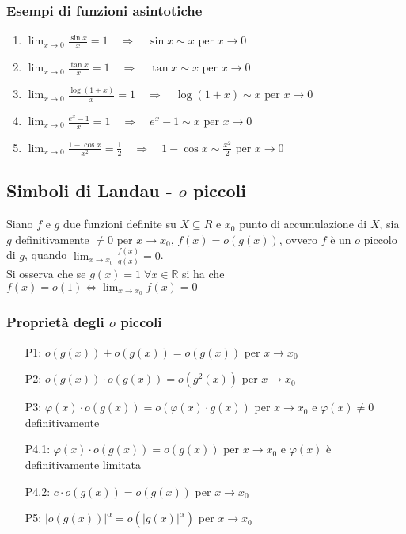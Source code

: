 \documentclass[a4paper]{article}
\begin{document}
\subsubsection*{Esempi di funzioni asintotiche}
\begin{enumerate}
	\item \(\displaystyle \lim_{x \to 0} \frac{\sin x}{x} = 1 \quad \Rightarrow \quad \sin x \sim x \text{ per } x \to 0\)
	\item \(\displaystyle \lim_{x \to 0} \frac{\tan x}{x} = 1 \quad \Rightarrow \quad \tan x \sim x \text{ per } x \to 0\)
	\item \(\displaystyle \lim_{x \to 0} \frac{\log (1 + x)}{x} = 1 \quad \Rightarrow \quad \log (1 + x) \sim x \text{ per } x \to 0\)
	\item \(\displaystyle \lim_{x \to 0} \frac{e ^ x - 1}{x} = 1 \quad \Rightarrow \quad e ^ x - 1 \sim x \text{ per } x \to 0\)
	\item \(\displaystyle \lim_{x \to 0} \frac{1 - \cos x}{x^2} = \frac{1}{2} \quad \Rightarrow \quad 1 - \cos x \sim \frac{x^2}{2} \text{ per } x \to 0\)
\end{enumerate}

\newpage

\subsection{Simboli di Landau - \(o\) piccoli}
Siano \(f\) e \(g\) due funzioni definite su \(X \subseteq R\) e \(x_0\) punto di accumulazione di \(X\), sia \(g\) definitivamente \(\neq 0\) per \(x \to x_0\),
\(f(x) = o(g(x))\), ovvero \(f\) è un \(o\) piccolo di \(g\), quando \(\displaystyle \lim_{x \to x_0} \frac{f(x)}{g(x)} = 0\). \\
Si osserva che se \(g(x) = 1 \; \forall x \in \mathbb{R}\) si ha che \(f(x) = o(1) \Leftrightarrow \displaystyle \lim_{x \to x_0} f(x) = 0\)

\subsubsection*{Proprietà degli \(o\) piccoli}
\begin{itemize}
	\item[P1:] \(o(g(x)) \pm o(g(x)) = o(g(x))\) per \(x \to x_0\)
	\item[P2:] \(o(g(x)) \cdot o(g(x)) = o(g^2(x))\) per \(x \to x_0\)
	\item[P3:] \(\varphi(x) \cdot o(g(x)) = o(\varphi (x) \cdot g(x))\) per \(x \to x_0\) e \(\varphi(x) \neq 0\) definitivamente
	\item[P4.1:] \(\varphi(x) \cdot o(g(x)) = o(g(x))\) per \(x \to x_0\) e \(\varphi(x)\) è definitivamente limitata
	\item[P4.2:] \(c \cdot o(g(x)) = o(g(x))\) per \(x \to x_0\)
	\item[P5:] \(\left| o(g(x)) \right| ^ \alpha = o(\left| g(x) \right| ^ \alpha)\) per \(x \to x_0\)
\end{itemize}
\end{document}
